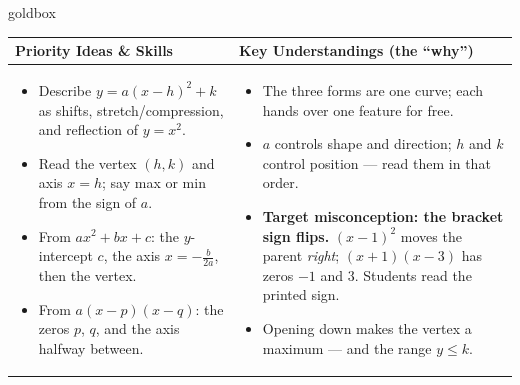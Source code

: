\documentclass[10pt]{article}
\begin{document}
\renewcommand{\arraystretch}{1.4}
\begin{skillbox}{goldbox}
\begin{tabularx}{\linewidth}{@{}X|X@{}}
\textbf{Priority Ideas \& Skills} & \textbf{Key Understandings (the ``why'')} \\[2pt]
\hline
\vspace{-6pt}
\begin{itemize}[leftmargin=1.1em, nosep, after=\vspace{2pt}]
  \item Describe $y=a(x-h)^2+k$ as shifts, stretch/compression, and reflection of $y=x^2$.
  \item Read the vertex $(h,k)$ and axis $x=h$; say max or min from the sign of $a$.
  \item From $ax^2+bx+c$: the $y$-intercept $c$, the axis $x=-\frac{b}{2a}$, then the vertex.
  \item From $a(x-p)(x-q)$: the zeros $p$, $q$, and the axis halfway between.
\end{itemize}
&
\vspace{-6pt}
\begin{itemize}[leftmargin=1.1em, nosep, after=\vspace{2pt}]
  \item The three forms are one curve; each hands over one feature for free.
  \item $a$ controls shape and direction; $h$ and $k$ control position --- read them in that
        order.
  \item \textbf{Target misconception: the bracket sign flips.} $(x-1)^2$ moves the parent
        \emph{right}; $(x+1)(x-3)$ has zeros $-1$ and $3$. Students read the printed sign.
  \item Opening down makes the vertex a maximum --- and the range $y\le k$.
\end{itemize}
\end{tabularx}
\end{skillbox}
\end{document}
